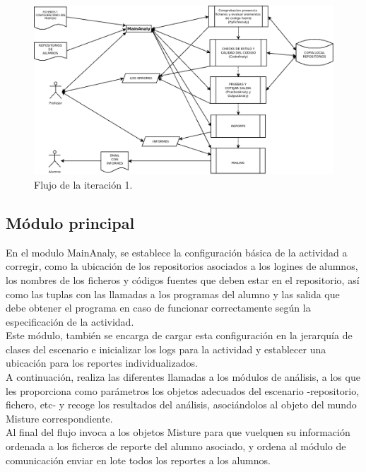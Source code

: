 \begin{figure}[H]
   \centering
   \includegraphics[width=16cm]{img/Diagram2_iteracion1}
   \caption{Flujo de la iteración 1.}
   \label{figura:ite1}
\end{figure}


\subsection{Módulo principal}

En el modulo MainAnaly, se establece la configuración básica de la actividad a corregir, como la ubicación de los repositorios asociados a los logines de alumnos, los nombres de los ficheros y códigos fuentes que deben estar en el repositorio, así como las tuplas con las llamadas a los programas del alumno y las salida que debe obtener el programa en caso de funcionar correctamente según la especificación de la actividad.\\


Este módulo, también se encarga de cargar esta configuración en la jerarquía de clases del escenario e inicializar los logs para la actividad y establecer una ubicación para los reportes individualizados.\\


A continuación, realiza las diferentes llamadas a los módulos de análisis, a los que les proporciona como parámetros los objetos adecuados del escenario -repositorio, fichero, etc- y recoge los resultados del análisis, asociándolos al objeto del mundo Misture correspondiente.\\

Al final del flujo invoca a los objetos Misture para que vuelquen su información ordenada a los ficheros de reporte del alumno asociado, y ordena al módulo de comunicación enviar en lote todos los reportes a los alumnos.\\

